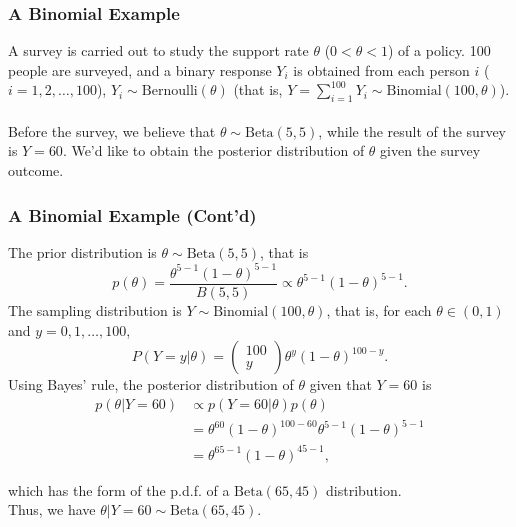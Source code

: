 \documentclass{beamer}
\begin{document}
\begin{frame}
\frametitle{A Binomial Example}
A survey is carried out to study the support rate $\theta$ ($0 < \theta < 1$) of a policy. 100 people are surveyed, and a binary response $Y_i$ is obtained from each person $i$ ($i=1,2,\ldots,100$), $Y_i \sim \text{Bernoulli}(\theta)$ (that is, $Y = \sum_{i=1}^{100}Y_i \sim \text{Binomial}(100,\theta)$). 
\\~\\
Before the survey, we believe that $\theta \sim \text{Beta}(5,5)$, while the result of the survey is $Y=60$. We'd like to obtain the posterior distribution of $\theta$ given the survey outcome.
\end{frame}

\begin{frame}
\frametitle{A Binomial Example (Cont'd)}
The prior distribution is $\theta \sim \text{Beta}(5,5)$, that is
$$
p(\theta) = \frac{\theta^{5-1}(1-\theta)^{5-1}}{B(5,5)}
\propto \theta^{5-1}(1-\theta)^{5-1}.
$$
The sampling distribution is $Y \sim \text{Binomial}(100,\theta)$, that is, for each $\theta \in (0,1)$ and $y=0,1,\ldots,100$,
$$
P(Y=y|\theta) = 
\begin{pmatrix}
100\\
y
\end{pmatrix}
\theta^{y}(1-\theta)^{100-y}.
$$
Using Bayes' rule, the posterior distribution of $\theta$ given that $Y=60$ is
$$
\begin{aligned}
p(\theta|Y=60) &\propto p(Y=60|\theta)p(\theta)\\
& = \theta^{60}(1-\theta)^{100-60} \theta^{5-1}(1-\theta)^{5-1}\\
&= \theta^{65-1}(1-\theta)^{45-1},
\end{aligned}
$$

which has the form of the p.d.f. of a $\text{Beta}(65,45)$ distribution.\\
Thus, we have $\theta|Y=60 \sim \text{Beta}(65,45)$.
\end{frame}
\end{document}
